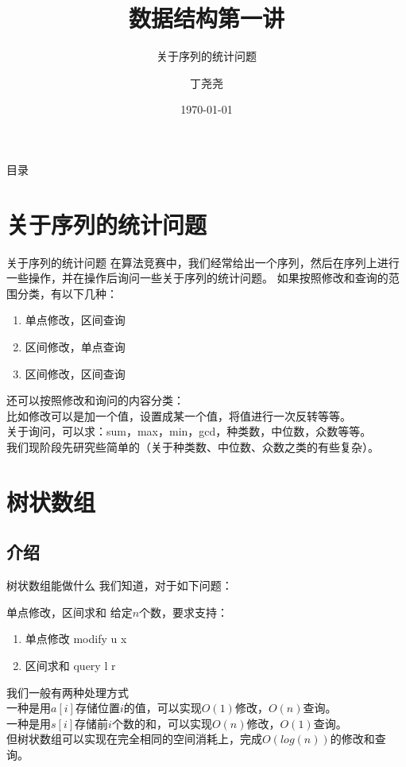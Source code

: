 \documentclass{beamer}
\title{数据结构第一讲}
\subtitle{关于序列的统计问题}
\author{丁尧尧}
\institute{上海交通大学}
\date{\today}
\begin{document}
	\maketitle
	\begin{frame}{目录}
		\tableofcontents
	\end{frame}
	\section{关于序列的统计问题}
		\begin{frame}{关于序列的统计问题}
			在算法竞赛中，我们经常给出一个序列，然后在序列上进行一些操作，并在操作后询问一些关于序列的统计问题。
			如果按照修改和查询的范围分类，有以下几种：
			\begin{enumerate}
				\item 单点修改，区间查询
				\item 区间修改，单点查询
				\item 区间修改，区间查询
			\end{enumerate}
			还可以按照修改和询问的内容分类：\\
			比如修改可以是加一个值，设置成某一个值，将值进行一次反转等等。\\
			关于询问，可以求：sum，max，min，gcd，种类数，中位数，众数等等。\\
			我们现阶段先研究些简单的（关于种类数、中位数、众数之类的有些复杂）。
		\end{frame} 
	\section{树状数组}
		\subsection{介绍}
			\begin{frame}{树状数组能做什么}
				我们知道，对于如下问题： \\
				\begin{block}{单点修改，区间求和} 
					给定$n$个数，要求支持：\\
					\begin{enumerate}
						\item 单点修改 modify u x
						\item 区间求和 query l r
					\end{enumerate}
				\end{block}
				我们一般有两种处理方式\\
				一种是用$a[i]$存储位置$i$的值，可以实现$O(1)$修改，$O(n)$查询。\\
				一种是用$s[i]$存储前$i$个数的和，可以实现$O(n)$修改，$O(1)$查询。\\
				但树状数组可以实现在完全相同的空间消耗上，完成$O(log(n))$的修改和查询。
			\end{frame}
\end{document}
